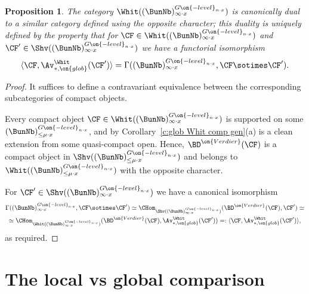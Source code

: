 \documentclass[9pt]{amsart}
\newtheorem{prop}[subsubsection]{Proposition}
\theoremstyle{definition}
\theoremstyle{remark}
\newcommand{\corref}[1]{Corollary~\ref{#1}}
\numberwithin{equation}{section}
\begin{document}
\begin{prop}  \label{p:Verdier for glob Whit}
The category $\Whit((\BunNb)^{G\on{-level}_{n\cdot x}}_{\infty\cdot x})$ is canonically dual to 
a similar category defined using the opposite character; this duality is uniquely defined by the property that 
for $\CF\in \Whit((\BunNb)^{G\on{-level}_{n\cdot x}}_{\infty\cdot x})$ and $\CF'\in 
\Shv((\BunNb)^{G\on{-level}_{n\cdot x}}_{\infty\cdot x})$ we have a functorial isomorphism
\begin{equation} \label{e:Av duality}
\langle \CF,\Av_{*,\on{glob}}^{\Whit}(\CF')\rangle=
\Gamma((\BunNb)^{G\on{-level}_{n\cdot x}}_{\infty\cdot x},\CF\sotimes \CF').
\end{equation} 
\end{prop}

\begin{proof}

It suffices to define a contravariant equivalence between the corresponding subcategories of compact objects.

\medskip

Every compact object $\CF\in \Whit((\BunNb)^{G\on{-level}_{n\cdot x}}_{\infty\cdot x})$ is supported on 
some $(\BunNb)^{G\on{-level}_{n\cdot x}}_{\leq \mu \cdot x}$, and by \corref{c:glob Whit comp gen}(a)
is a clean extension from some quasi-compact open. Hence, $\BD^{\on{Verdier}}(\CF)$ is a compact object
in $\Shv((\BunNb)^{G\on{-level}_{n\cdot x}}_{\leq \mu \cdot x})$ and belongs to 
$\Whit((\BunNb)^{G\on{-level}_{n\cdot x}}_{\leq \mu \cdot x})$ with the opposite character.

\medskip

For $\CF'\in \Shv((\BunNb)^{G\on{-level}_{n\cdot x}}_{\infty\cdot x})$ we have a canonical isomorphism
\begin{multline*}
\Gamma((\BunNb)^{G\on{-level}_{n\cdot x}}_{\infty\cdot x},\CF\sotimes \CF')\simeq
\CHom_{\Shv((\BunNb)^{G\on{-level}_{n\cdot x}}_{\infty\cdot x})}(\BD^{\on{Verdier}}(\CF),\CF')\simeq \\
\simeq \CHom_{\Whit((\BunNb)^{G\on{-level}_{n\cdot x}}_{\infty\cdot x})}(\BD^{\on{Verdier}}(\CF),\Av_{*,\on{glob}}^{\Whit}(\CF'))=:
\langle \CF,\Av_{*,\on{glob}}^{\Whit}(\CF')\rangle,
\end{multline*}
as required. 

\end{proof} 


\section{The local vs global comparison}  \label{s:global-to-local}
\end{document}
